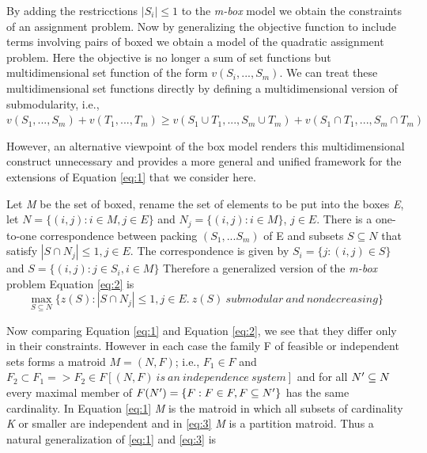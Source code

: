 \documentclass[11pt,a4paper,oneside]{report}
\begin{document}
By adding the restricctions $|S_i| \leq 1$ to the \textit{m-box} model we obtain the constraints of an assignment problem. Now by generalizing the objective function to include terms involving pairs of boxed we obtain a model of the quadratic assignment problem. Here the objective is no longer a sum of set functions but multidimensional set function of the form $v(S_i,...,S_m)$. We can treat these multidimensional set functions directly by defining a multidimensional version of submodularity, i.e.,\\

$v(S_1,...,S_m) + v(T_1,...,T_m) \geq v(S_1 \cup T_1,..., S_m \cup T_m) + v(S_1 \cap T_1,..., S_m \cap T_m)$

However, an alternative viewpoint of the box model renders this multidimensional construct unnecessary and provides a more general and unified framework for the extensions of Equation \ref{eq:1} that we consider here.

Let \textit{M} be the set of boxed, rename the set of elements to be put into the boxes \textit{E}, let $N = \{(i, j): i \in M, j \in E\}$ and $N_j = \{(i, j):i \in M\}$, $j \in E$. There is a one-to-one correspondence between packing $(S_1,...S_m)$ of E and subsets $S \subseteq N$ that satisfy $|S \cap N_j| \leq 1,j \in E$. The correspondence is given by $S_i = \{j:(i, j) \in S\}$ and $S = \{(i,j): j \in S_i, i \in M\}$ Therefore a generalized version of the \textit{m-box} problem Equation \ref{eq:2} is\\

\begin{equation}
\label{eq:3}
\max\limits_{S \subseteq N}\{z(S): |S \cap N_j| \leq 1, j \in E.\   z(S)\  submodular\  and \  nondecreasing\}
\end{equation}


Now comparing Equation \ref{eq:1} and Equation \ref{eq:2}, we see that they differ only in their constraints. However in each case the family F of feasible or independent sets forms a matroid $M = (N, F)$; i.e., $F_1 \in F$ and $F_2 \subset F_1  => F_2 \in F [(N, F)\  is\  an\  independence\  system ]$ and for all $N\sp{\prime} \subseteq N$ every maximal member of $F(N\sp{\prime}) = \{F:F\in F, F \subseteq N\sp{\prime} \}$ has the same cardinality. In Equation \ref{eq:1} \textit{M} is the matroid in which all subsets of cardinality \textit{K} or smaller are independent and in \ref{eq:3} \textit{M} is a partition matroid. Thus a natural generalization of \ref{eq:1} and \ref{eq:3} is\\
\end{document}
